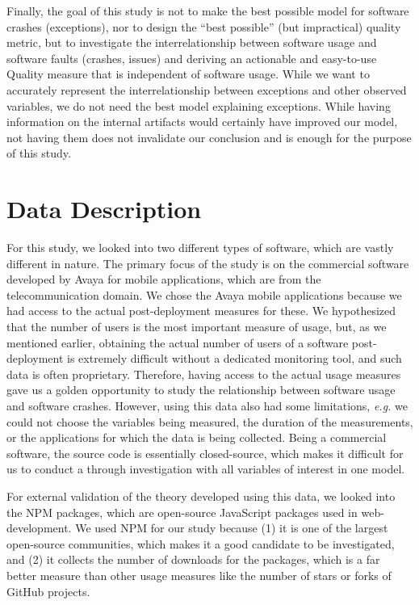 \documentclass[smallcondensed]{svjour3}     %
\begin{document}
Finally, the goal of this study is not to make the best possible model for software crashes (exceptions), nor to design the ``best possible'' (but impractical) quality metric, but to investigate the interrelationship between software usage and software faults (crashes, issues) and deriving an actionable and easy-to-use Quality measure that is independent of software usage. While we want to accurately represent the interrelationship between exceptions and other observed variables, we do not need the best model explaining exceptions. While having information on the internal artifacts would certainly have improved our model, not having them does not invalidate our conclusion and is enough for the purpose of this study.

\vspace{-10pt}
\section{Data Description}\label{s:data}

For this study, we looked into two different types of software, which are vastly different in nature. The primary focus of the study is on the commercial software developed by Avaya for mobile applications, which are from the telecommunication domain.  We chose the Avaya mobile applications because we had access to the actual post-deployment measures for these. We hypothesized that the number of users is the most important measure of usage, but, as we mentioned earlier, obtaining the actual number of users of a software post-deployment is extremely difficult without a dedicated monitoring tool, and such data is often proprietary. 
Therefore, having access to the actual usage measures gave us a golden opportunity to study the relationship between software usage and software crashes. However, using this data also had some limitations, \emph{e.g.} we could not choose the variables being measured, the duration of the measurements, or the applications for which the data is being collected. Being a commercial software, the source code is essentially closed-source, which makes it difficult for us to conduct a through investigation with all variables of interest in one model.

For external validation of the theory developed using this data, we looked into the NPM packages, which are open-source JavaScript packages used in web-development. We used NPM for our study because (1) it is one of the largest open-source communities, which makes it a good candidate to be investigated, and (2) it collects the number of downloads for the packages, which is a far better measure than other usage measures like the number of stars or forks of GitHub projects. 
\end{document}
